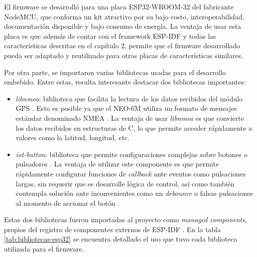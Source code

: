 El firmware se desarrolló para una placa ESP32-WROOM-32 del fabricante NodeMCU, que conforma un kit atractivo por su bajo costo, interoperabilidad, documentación disponible y bajo consumo de energía. La ventaja de usar esta placa es que además de contar con el framework ESP-IDF y todas las características descritas en el capítulo 2, permite que el firmware desarrollado pueda ser adaptado y reutilizado para otras placas de características similares.

Por otra parte, se importaron varias bibliotecas usadas para el desarrollo embebido. Entre estas, resulta interesante destacar dos bibliotecas importantes:
\begin{itemize}
	\item \textit{libnmea}: biblioteca que facilita la lectura de los datos recibidos del módulo GPS \citep{LIBNMEA:1}. Esto es posible ya que el NEO-6M utiliza un formato de mensajes estándar denominado NMEA \citep{NMEA:1}. La ventaja de usar \textit{libnmea} es que convierte los datos recibidos en estructuras de C, lo que permite acceder rápidamente a valores como la latitud, longitud, etc.
	\item \textit{iot-button}: biblioteca que permite configuraciones complejas sobre botones o pulsadores \citep{BUTTON:1}. La ventaja de utilizar este componente es que permite rápidamente configurar funciones de \textit{callback} ante eventos como pulsaciones largas, sin requerir que se desarrolle lógica de control, así como también contempla solución ante inconvenientes como un \textit{debounce} o falsas pulsaciones al momento de accionar el botón \citep{DEBOUNCE:1}.
\end{itemize}

Estas dos bibliotecas fueron importadas al proyecto como \textit{managed components}, propios del registro de componentes externos de ESP-IDF \citep{ESPIDF:1}. En la tabla \ref{tab:bibliotecas-esp32} se encuentra detallado el uso que tuvo cada biblioteca utilizada para el firmware.

